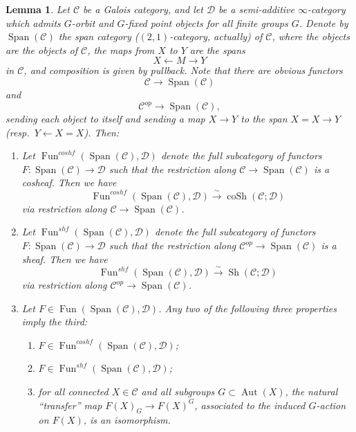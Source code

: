 \documentclass[10pt,a4paper]{amsart}
\newtheorem{lemma}{Lemma}
\newcommand{\mc}{\mathcal}
\newcommand{\on}{\operatorname}
\begin{document}
\begin{lemma}\label{transferlemma}
Let $\mc{C}$ be a Galois category, and let $\mc{D}$ be a semi-additive $\infty$-category which admits $G$-orbit and $G$-fixed point objects for all finite groups $G$.  Denote by $\on{Span}(\mc{C})$ the span category ($(2,1)$-category, actually) of $\mc{C}$, where the objects are the objects of $\mc{C}$, the maps from $X$ to $Y$ are the spans
$$X \leftarrow M \to Y$$
in $\mc{C}$, and composition is given by pullback.  Note that there are obvious functors
$$\mc{C} \to \on{Span}(\mc{C})$$
and
$$\mc{C}^{op} \to \on{Span}(\mc{C}),$$
sending each object to itself and sending a map $X\to Y$ to the span $X=X\to Y$ (resp.\ $Y\leftarrow X=X$). Then:

\begin{enumerate}
\item Let $\on{Fun}^{coshf}(\on{Span}(\mc{C}),\mc{D})$ denote the full subcategory of functors $F:\on{Span}(\mc{C})\to \mc{D}$ such that the restriction along $\mc{C}\to \on{Span}(\mc{C})$ is a cosheaf.  Then we have
$$\on{Fun}^{coshf}(\on{Span}(\mc{C}),\mc{D})\overset{\sim}{\rightarrow}\on{coSh}(\mc{C};\mc{D})$$
via restriction along $\mc{C} \to \on{Span}(\mc{C})$.
\item Let $\on{Fun}^{shf}(\on{Span}(\mc{C}),\mc{D})$ denote the full subcategory of functors $F:\on{Span}(\mc{C})\to \mc{D}$ such that the restriction along $\mc{C}^{op}\to \on{Span}(\mc{C})$ is a sheaf.  Then we have
$$\on{Fun}^{shf}(\on{Span}(\mc{C}),\mc{D})\overset{\sim}{\rightarrow}\on{Sh}(\mc{C};\mc{D})$$
via restriction along $\mc{C}^{op} \to \on{Span}(\mc{C})$.
\item Let $F \in \on{Fun}(\on{Span}(\mc{C}),\mc{D})$.  Any two of the following three properties imply the third:
\begin{enumerate}
\item $F\in \on{Fun}^{coshf}(\on{Span}(\mc{C}),\mc{D})$;
\item $F\in \on{Fun}^{shf}(\on{Span}(\mc{C}),\mc{D})$;
\item for all connected $X\in\mc{C}$ and all subgroups $G\subset \on{Aut}(X)$, the natural ``transfer'' map $F(X)_G \to F(X)^G$, associated to the induced $G$-action on $F(X)$, is an isomorphism.
\end{enumerate}
\end{enumerate}
\end{lemma}
\end{document}
